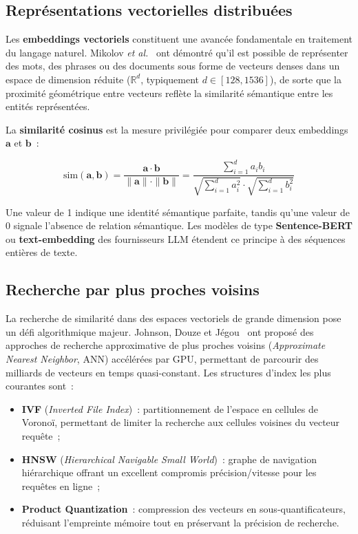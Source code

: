 \subsection{Représentations vectorielles distribuées}

Les \textbf{embeddings vectoriels} constituent une avancée fondamentale en traitement du langage naturel. Mikolov \textit{et al.}~\cite{mikolov2013} ont démontré qu'il est possible de représenter des mots, des phrases ou des documents sous forme de vecteurs denses dans un espace de dimension réduite ($\mathbb{R}^d$, typiquement $d \in [128, 1536]$), de sorte que la proximité géométrique entre vecteurs reflète la similarité sémantique entre les entités représentées.

La \textbf{similarité cosinus} est la mesure privilégiée pour comparer deux embeddings $\mathbf{a}$ et $\mathbf{b}$~:

\begin{equation}
\text{sim}(\mathbf{a}, \mathbf{b}) = \frac{\mathbf{a} \cdot \mathbf{b}}{\|\mathbf{a}\| \cdot \|\mathbf{b}\|} = \frac{\sum_{i=1}^{d} a_i b_i}{\sqrt{\sum_{i=1}^{d} a_i^2} \cdot \sqrt{\sum_{i=1}^{d} b_i^2}}
\end{equation}

\noindent Une valeur de 1 indique une identité sémantique parfaite, tandis qu'une valeur de 0 signale l'absence de relation sémantique. Les modèles de type \textbf{Sentence-BERT} ou \textbf{text-embedding} des fournisseurs LLM étendent ce principe à des séquences entières de texte.

\subsection{Recherche par plus proches voisins}

La recherche de similarité dans des espaces vectoriels de grande dimension pose un défi algorithmique majeur. Johnson, Douze et Jégou~\cite{johnson2019} ont proposé des approches de recherche approximative de plus proches voisins (\textit{Approximate Nearest Neighbor}, ANN) accélérées par GPU, permettant de parcourir des milliards de vecteurs en temps quasi-constant. Les structures d'index les plus courantes sont~:

\begin{itemize}[noitemsep]
    \item \textbf{IVF} (\textit{Inverted File Index})~: partitionnement de l'espace en cellules de Voronoï, permettant de limiter la recherche aux cellules voisines du vecteur requête~;
    \item \textbf{HNSW} (\textit{Hierarchical Navigable Small World})~: graphe de navigation hiérarchique offrant un excellent compromis précision/vitesse pour les requêtes en ligne~;
    \item \textbf{Product Quantization}~: compression des vecteurs en sous-quantificateurs, réduisant l'empreinte mémoire tout en préservant la précision de recherche.
\end{itemize}

